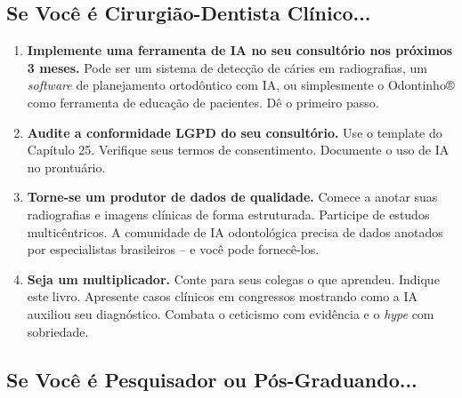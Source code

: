 \subsection{Se Você é Cirurgião-Dentista Clínico...}

\begin{enumerate}
  \item \textbf{Implemente uma ferramenta de IA no seu consultório nos próximos
    3 meses.} Pode ser um sistema de detecção de cáries em radiografias, um
    \textit{software} de planejamento ortodôntico com IA, ou simplesmente o
    Odontinho® como ferramenta de educação de pacientes. Dê o primeiro passo.

  \item \textbf{Audite a conformidade LGPD do seu consultório.} Use o template
    do Capítulo 25. Verifique seus termos de consentimento. Documente o uso de
    IA no prontuário.

  \item \textbf{Torne-se um produtor de dados de qualidade.} Comece a anotar
    suas radiografias e imagens clínicas de forma estruturada. Participe de
    estudos multicêntricos. A comunidade de IA odontológica precisa de dados
    anotados por especialistas brasileiros -- e você pode fornecê-los.

  \item \textbf{Seja um multiplicador.} Conte para seus colegas o que aprendeu.
    Indique este livro. Apresente casos clínicos em congressos mostrando como
    a IA auxiliou seu diagnóstico. Combata o ceticismo com evidência e o
    \textit{hype} com sobriedade.
\end{enumerate}

\subsection{Se Você é Pesquisador ou Pós-Graduando...}


